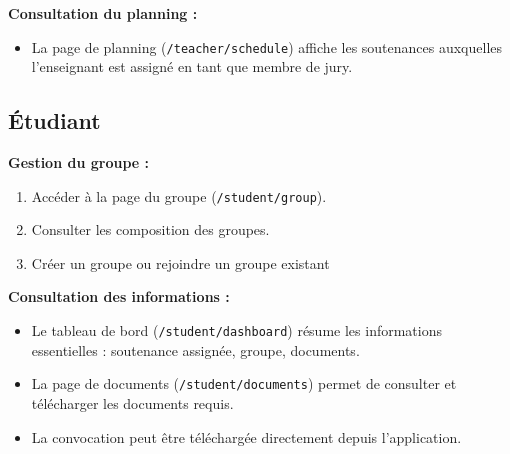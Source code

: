 \textbf{Consultation du planning :}
\begin{itemize}
    \item La page de planning (\texttt{/teacher/schedule}) affiche les soutenances auxquelles l'enseignant est assigné en tant que membre de jury.
\end{itemize}

\subsection{Étudiant}

\textbf{Gestion du groupe :}
\begin{enumerate}
    \item Accéder à la page du groupe (\texttt{/student/group}).
    \item Consulter les composition des groupes.
    \item Créer un groupe ou rejoindre un groupe existant
\end{enumerate}

\textbf{Consultation des informations :}
\begin{itemize}
    \item Le tableau de bord (\texttt{/student/dashboard}) résume les informations essentielles : soutenance assignée, groupe, documents.
    \item La page de documents (\texttt{/student/documents}) permet de consulter et télécharger les documents requis.
    \item La convocation peut être téléchargée directement depuis l'application.
\end{itemize}

